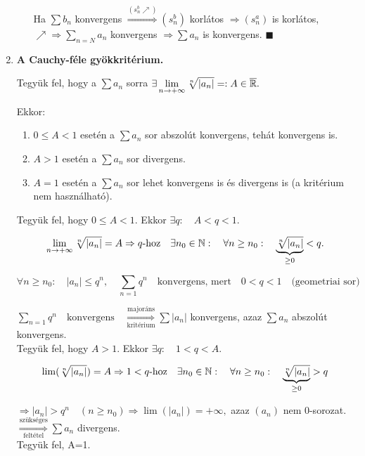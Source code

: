 \documentclass[a4paper,11.5pt]{article}
\begin{document}
\begin{enumerate}
\begin{enumerate}
			Ha $\sum b_n$ konvergens $\overset{(s_n^b\nearrow)}{\Longrightarrow}(s_n^b)$ korlátos $\Rightarrow (s_n^a)$ is korlátos, $\nearrow\Rightarrow\displaystyle\sum_{n=N}a_n$ konvergens $\Rightarrow \sum a_n$ is konvergens. \quad$\blacksquare$
		\end{enumerate}
		
		\item \textbf{A Cauchy-féle gyökkritérium.}
		
		Tegyük fel, hogy a $\sum a_n$ sorra $\exists\displaystyle\lim_{n\to +\infty} \sqrt[n]{|a_n|}=:A\in \overline{\mathbb{R}}.$
		
		Ekkor:
		\begin{enumerate}
			\item $0 \leq A <1$ esetén a $\sum a_n$ sor abszolút konvergens, tehát konvergens is.
			\item $A>1$ esetén a $\sum a_n$ sor divergens.
			\item $A=1$ esetén a $\sum a_n$ sor lehet konvergens is és divergens is (a kritérium nem használható).
		\end{enumerate}
		
		\biz Tegyük fel, hogy $0\leq A<1$. Ekkor $\exists q:\quad A<q<1$.
		
		\[\displaystyle\lim_{n\to +\infty}\sqrt[n]{|a_n|}=A \Rightarrow q\text{-hoz} \quad  \exists n_0 \in \mathbb{N}: \quad\forall n \geq n_0: \quad\underbrace{\sqrt[n]{|a_n|}}_{\geq 0}<q.\]
		
		\[ \forall n\geq n_0: \quad|a_n|\leq q^n,\quad  \sum_{n=1}q^n \quad\text{konvergens, mert}\quad 0<q<1 \quad \text{(geometriai sor)} \]
		
		$\displaystyle\sum_{n=1} q^n \quad\text{konvergens} \quad\overset{\text{majoráns}}{\underset{\text{kritérium}}{\Longrightarrow}} \sum |a_n| $ konvergens, azaz $\displaystyle\sum a_n$ abszolút konvergens.\\
		
		Tegyük fel, hogy $A>1$. Ekkor $\exists q:\quad 1<q<A$.
		
		\[ \lim(\sqrt[n]{|a_n|})=A \Rightarrow 1<q\text{-hoz}\quad \exists n_0 \in \mathbb{N}: \quad\forall n \geq n_0: \quad\underbrace{\sqrt[n]{|a_n|}}_{\geq 0}>q \]
		
		$\Rightarrow |a_n|>q^n \quad (n\geq n_0) \Rightarrow \lim(|a_n|)=+\infty,$ azaz $(a_n)$ nem 0-sorozat. $\overset{\text{szükséges}}{\underset{\text{feltétel}}{\Longrightarrow}} \sum a_n$ divergens.\\
		
		Tegyük fel, A=1. 
		

\end{enumerate}
\end{document}
